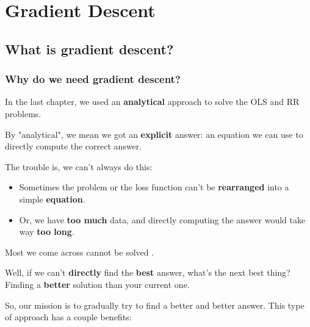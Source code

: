 \setcounter{chapter}{2}

\chapter{Gradient Descent}

\label{chap:gradient}

\section*{What is gradient descent?}


    \subsection{Why do we need gradient descent?}

        In the last chapter, we used an \textbf{analytical} approach to solve the OLS and RR problems.
        
        By "analytical", we mean we got an \textbf{explicit} answer: an equation we can use to directly compute the correct answer.
        
        The trouble is, we can't always do this:
        
        \begin{itemize}
            \item Sometimes the problem or the loss function can't be \textbf{rearranged} into a simple \textbf{equation}. 
            
            \item Or, we have \textbf{too much} data, and directly computing the answer would take way \textbf{too long}.\\
        \end{itemize}
        
        \begin{concept}
            Most  we come across cannot be solved .
        \end{concept}
        
        Well, if we can't \textbf{directly} find the \textbf{best} answer, what's the next best thing? Finding a \textbf{better} solution than your current one.
        
        So, our mission is to gradually try to find a better and better answer. This type of approach has a couple benefits:
        
